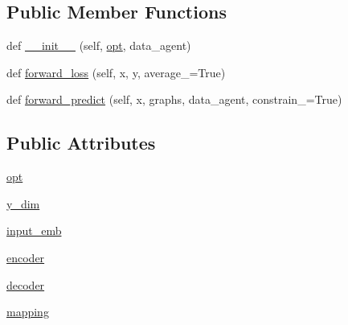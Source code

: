 \subsection*{Public Member Functions}
\begin{DoxyCompactItemize}
\item 
def \hyperlink{classmastering__the__dungeon_1_1agents_1_1graph__world2_1_1models_1_1Seq2SeqModel_abea2a1ce728b6d8e2e9e48019114a032}{\+\_\+\+\_\+init\+\_\+\+\_\+} (self, \hyperlink{classmastering__the__dungeon_1_1agents_1_1graph__world2_1_1models_1_1Seq2SeqModel_aec64acdbeeff0f3de310e3f82169b11a}{opt}, data\+\_\+agent)
\item 
def \hyperlink{classmastering__the__dungeon_1_1agents_1_1graph__world2_1_1models_1_1Seq2SeqModel_afe533efb615cc66d6565408e9cc45e49}{forward\+\_\+loss} (self, x, y, average\+\_\+=True)
\item 
def \hyperlink{classmastering__the__dungeon_1_1agents_1_1graph__world2_1_1models_1_1Seq2SeqModel_ac3ede43d27b6708c3568ed1d1c8a8944}{forward\+\_\+predict} (self, x, graphs, data\+\_\+agent, constrain\+\_\+=True)
\end{DoxyCompactItemize}
\subsection*{Public Attributes}
\begin{DoxyCompactItemize}
\item 
\hyperlink{classmastering__the__dungeon_1_1agents_1_1graph__world2_1_1models_1_1Seq2SeqModel_aec64acdbeeff0f3de310e3f82169b11a}{opt}
\item 
\hyperlink{classmastering__the__dungeon_1_1agents_1_1graph__world2_1_1models_1_1Seq2SeqModel_acaeacfb61bed4e91cb7c243ed0bbb405}{y\+\_\+dim}
\item 
\hyperlink{classmastering__the__dungeon_1_1agents_1_1graph__world2_1_1models_1_1Seq2SeqModel_a3a1f790f22b69102e3734361de8f7091}{input\+\_\+emb}
\item 
\hyperlink{classmastering__the__dungeon_1_1agents_1_1graph__world2_1_1models_1_1Seq2SeqModel_a31f2ec8eb6dbf2926fc11d5387e70281}{encoder}
\item 
\hyperlink{classmastering__the__dungeon_1_1agents_1_1graph__world2_1_1models_1_1Seq2SeqModel_aef8ffba183519efaeb731bf05b838bf8}{decoder}
\item 
\hyperlink{classmastering__the__dungeon_1_1agents_1_1graph__world2_1_1models_1_1Seq2SeqModel_afb38ecb1415fdafff3c017f0cbe15ad5}{mapping}
\end{DoxyCompactItemize}


